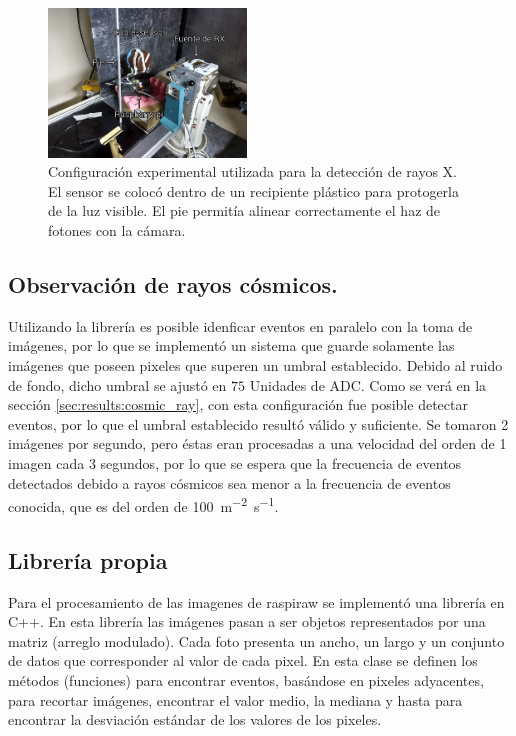 \documentclass[twoside,twocolumn]{article}
\begin{document}
      \begin{figure}[h]
        \includegraphics[width=0.47\textwidth]{figures/IMG_20180412_173110355_HDR}
        \caption{Configuración experimental utilizada para la detección de rayos X.
        El sensor se colocó dentro de un recipiente plástico para protogerla de la luz visible.
        El pie permitía alinear correctamente el haz de fotones con la cámara.
        }
        \label{fig:photo_xray}
      \end{figure}

    \subsection{Observación de rayos cósmicos.}\label{sec:conf_exp:cosmic_ray}
      Utilizando la librería es posible idenficar eventos en paralelo con la toma de imágenes,
      por lo que se implementó un sistema que guarde solamente las imágenes que poseen pixeles que superen un umbral establecido.
      Debido al ruido de fondo, dicho umbral se ajustó en $75$ Unidades de ADC. 
      Como se verá en la sección \ref{sec:results:cosmic_ray}, con esta configuración fue posible detectar eventos,
      por lo que el umbral establecido resultó válido y suficiente.
      Se tomaron 2 imágenes por segundo, pero éstas eran procesadas a una velocidad
      del orden de 1 imagen cada 3 segundos, por lo que se espera que la frecuencia de eventos
      detectados debido a rayos cósmicos sea menor a la frecuencia de eventos conocida,
      que es del orden de \SI{100}{\meter^{-2}\second^{-1}}. %

    \subsection{Librería propia}\label{sec:conf_exp:library}
      Para el procesamiento de las imagenes de raspiraw se implementó una librería en C++. En esta librería las imágenes pasan
      a ser objetos representados por una matriz (arreglo modulado). Cada foto presenta un ancho, un largo y un conjunto de datos que
      corresponder al valor de cada pixel. En esta clase se definen los métodos (funciones) para encontrar eventos, basándose en
      pixeles adyacentes, para recortar imágenes, encontrar el valor medio, la mediana y hasta para encontrar
      la desviación estándar de los valores de los pixeles.
\end{document}
